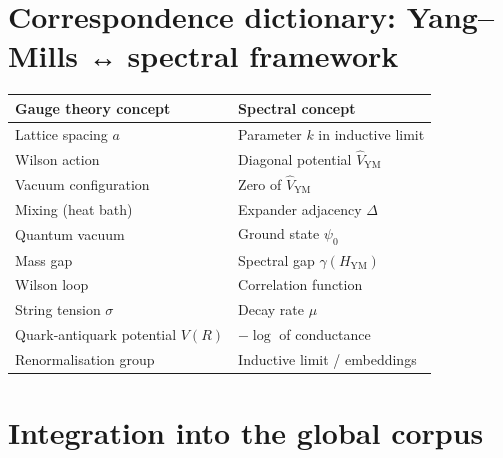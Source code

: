 \documentclass[11pt,a4paper]{article}
\begin{document}
\section{Correspondence dictionary: Yang–Mills ↔ spectral framework}

\begin{center}
\small
\begin{tabular}{@{}l|l@{}}
\toprule
\textbf{Gauge theory concept} & \textbf{Spectral concept} \\
\midrule
Lattice spacing \(a\) & Parameter \(k\) in inductive limit \\
Wilson action & Diagonal potential \(\hat{V}_{\mathrm{YM}}\) \\
Vacuum configuration & Zero of \(\hat{V}_{\mathrm{YM}}\) \\
Mixing (heat bath) & Expander adjacency \(\Delta\) \\
Quantum vacuum & Ground state \(\psi_0\) \\
Mass gap & Spectral gap \(\gamma(H_{\mathrm{YM}})\) \\
Wilson loop & Correlation function \\
String tension \(\sigma\) & Decay rate \(\mu\) \\
Quark‑antiquark potential \(V(R)\) & \(-\log\) of conductance \\
Renormalisation group & Inductive limit / embeddings \\
\bottomrule
\end{tabular}
\normalsize
\end{center}

\section{Integration into the global corpus}
\end{document}
